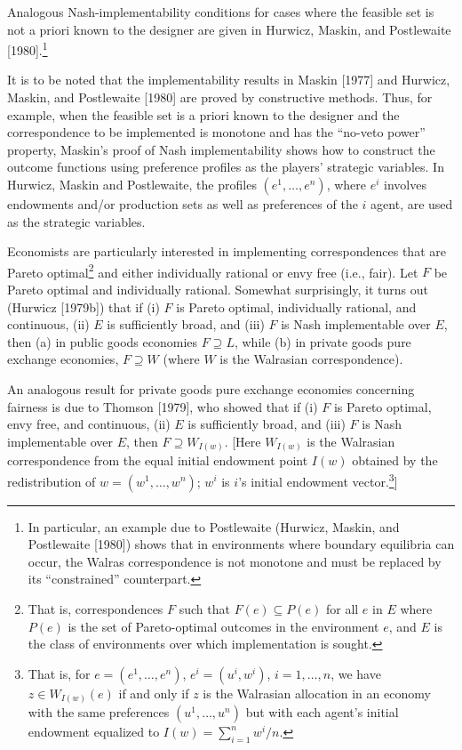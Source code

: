 \documentclass[12pt, letterpaper]{article}
\begin{document}
Analogous Nash-implementability conditions for cases where the feasible set is not a priori known to the designer are given in Hurwicz, Maskin, and Postlewaite [1980].\footnote{In particular, an example due to Postlewaite (Hurwicz, Maskin, and Postlewaite [1980]) shows that in environments where boundary equilibria can occur, the Walras correspondence is not monotone and must be replaced by its ``constrained'' counterpart.}

It is to be noted that the implementability results in Maskin [1977] and Hurwicz, Maskin, and Postlewaite [1980] are proved by constructive methods. Thus, for example, when the feasible set is a priori known to the designer and the correspondence to be implemented is monotone and has the ``no-veto power'' property, Maskin's proof of Nash implementability shows how to construct the outcome functions using preference profiles as the players' strategic variables. In Hurwicz, Maskin and Postlewaite, the profiles $(e^1, \dots, e^n)$, where $e^i$ involves endowments and/or production sets as well as preferences of the $i$ agent, are used as the strategic variables.

Economists are particularly interested in implementing correspondences that are Pareto optimal\footnote{That is, correspondences $F$ such that $F(e) \subseteq P(e)$ for all $e$ in $E$ where $P(e)$ is the set of Pareto-optimal outcomes in the environment $e$, and $E$ is the class of environments over which implementation is sought.} and either individually rational or envy free (i.e., fair). Let $F$ be Pareto optimal and individually rational. Somewhat surprisingly, it turns out (Hurwicz [1979b]) that if (i) $F$ is Pareto optimal, individually rational, and continuous, (ii) $E$ is sufficiently broad, and (iii) $F$ is Nash implementable over $E$, then (a) in public goods economies $F \supseteq L$, while (b) in private goods pure exchange economies, $F \supseteq W$ (where $W$ is the Walrasian correspondence).

An analogous result for private goods pure exchange economies concerning fairness is due to Thomson [1979], who showed that if (i) $F$ is Pareto optimal, envy free, and continuous, (ii) $E$ is sufficiently broad, and (iii) $F$ is Nash implementable over $E$, then $F \supseteq W_{I(w)}$. [Here $W_{I(w)}$ is the Walrasian correspondence from the equal initial endowment point $I(w)$ obtained by the redistribution of $w = (w^1, \dots, w^n)$; $w^i$ is $i$'s initial endowment vector.\footnote{That is, for $e = (e^1, \dots, e^n)$, $e^i = (u^i, w^i)$, $i = 1, \dots, n$, we have $z \in W_{I(w)}(e)$ if and only if $z$ is the Walrasian allocation in an economy with the same preferences $(u^1, \dots, u^n)$ but with each agent's initial endowment equalized to $I(w) = \sum_{i=1}^n w^i/n$.}]
\end{document}
